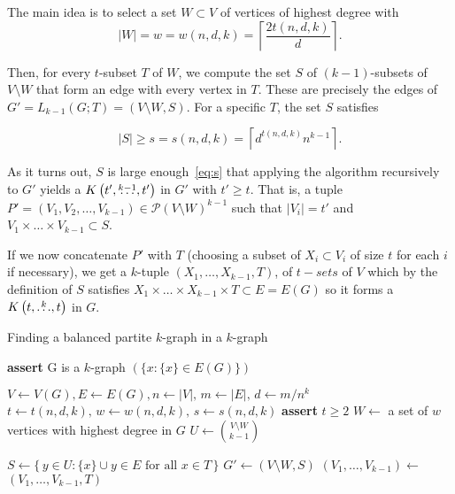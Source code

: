 The main idea is to select a set $W \subset V$ of vertices of highest degree with
\begin{equation}
    \label{eq:w}
    |W| = w = w(n, d, k) = \left\lceil \frac{2t(n, d, k)}{d} \right\rceil.
\end{equation}

Then, for every $t$-subset $T$ of $W$, we compute the set $S$ of $(k-1)$-subsets of $V \setminus W$
that form an edge with every vertex in $T$.
These are precisely the edges of $G' = L_{k-1}(G; T) = (V \setminus W, S)$.
For a specific $T$, the set $S$ satisfies

\begin{equation}
    \label{eq:s}
    |S| \geq s = s(n, d, k) = \left\lceil d^{t(n, d, k)} n^{k-1} \right\rceil.
\end{equation}

As it turns out, $S$ is large enough~\eqref{eq:s}
that applying the algorithm recursively to $G'$
yields a $K\left(t', \overset{k-1}{\dots}, t'\right)$ in $G'$ with $t' \geq t$.
That is, a tuple
$P' = (V_1, V_2, \dots, V_{k-1}) \in \mathcal{P}(V \setminus W)^{k-1}$ such that $|V_i| = t'$ and
$V_1 \times \dots \times V_{k-1}\subset S$.

If we now concatenate $P'$ with $T$ (choosing a subset of $X_i \subset V_i$ of size $t$ for each $i$ if necessary), we get
a $k$-tuple $(X_1, \dots, X_{k-1}, T)$, of $t-sets$ of $V$ %
which by the definition of $S$ satisfies
$X_1 \times \dots \times X_{k-1} \times T \subset E = E(G)$
so it forms a $K\left(t, \overset{k}{\dots}, t\right)$ in $G$.

\begin{algorithm}[H]
    \caption{Finding a balanced partite $k$-graph in a $k$-graph}
    \label{alg:kpartite}
    \begin{algorithmic}[1]
            \State \textbf{assert} G is a $k$-graph
             \label{line:base_case}
                \State \Return $(\{x \colon \{x\} \in E(G)\})$
            \EndIf

            \State $V \gets V(G), E \gets E(G), n \gets |V|,\, m \gets |E|,\, d \gets m/n^k$
            \State $t \gets t(n, d, k),\, w \gets w(n, d, k),\, s \gets s(n, d, k)$ \label{line:tws}
            \State \textbf{assert} $t \geq 2$ \label{line:min_t}
            \State $W \gets$ a set of $w$ vertices with highest degree in $G$ \label{line:W}
            \State $U \gets \binom{V\setminus W}{k-1}$

             \label{line:for}
                \State $S \gets \{\,y \in U \colon \{x\} \cup y \in E \text{ for all } x \in T\,\}$ \label{line:S}
                    \State $G' \gets (V \setminus W, S)$ \label{line:rec_call}
                    \State $(V_1, \dots, V_{k-1}) \gets$ 
                    \State \Return $(V_1, \dots, V_{k-1}, T)$ \label{line:return}
                \EndIf
            \EndFor
        \EndFunction
    \end{algorithmic}
\end{algorithm}

